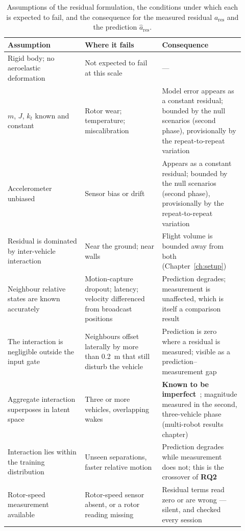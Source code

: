\begin{table}[t]
  \centering
  \caption{Assumptions of the residual formulation, the conditions under which each is expected to
    fail, and the consequence for the measured residual $a_{\mathrm{res}}$ and the prediction
    $\hat a_{\mathrm{res}}$.}
  \label{tab:model-assumptions}
  \small
  \begin{tabular}{@{}p{0.30\linewidth}p{0.30\linewidth}p{0.32\linewidth}@{}}
    \toprule
    Assumption & Where it fails & Consequence \\
    \midrule
    Rigid body; no aeroelastic deformation
      & Not expected to fail at this scale
      & --- \\
    $m$, $J$, $k_t$ known and constant
      & Rotor wear; temperature; miscalibration
      & Model error appears as a constant residual; bounded by the null scenarios (second phase), provisionally by the repeat-to-repeat variation \\
    Accelerometer unbiased
      & Sensor bias or drift
      & Appears as a constant residual; bounded by the null scenarios (second phase), provisionally by the repeat-to-repeat variation \\
    Residual is dominated by inter-vehicle interaction
      & Near the ground; near walls
      & Flight volume is bounded away from both (Chapter~\ref{ch:setup}) \\
    Neighbour relative states are known accurately
      & Motion-capture dropout; latency; velocity differenced from broadcast positions
      & Prediction degrades; measurement is unaffected, which is itself a comparison result \\
    The interaction is negligible outside the input gate
      & Neighbours offset laterally by more than \SI{0.2}{\metre} that still disturb the vehicle
      & Prediction is zero where a residual is measured; visible as a prediction--measurement gap \\
    Aggregate interaction superposes in latent space
      & Three or more vehicles, overlapping wakes
      & \textbf{Known to be imperfect}~\cite{shi2020neuralswarm,gielis2023aggregate}; magnitude measured in the second, three-vehicle phase (multi-robot results chapter) \\
    Interaction lies within the training distribution
      & Unseen separations, faster relative motion
      & Prediction degrades while measurement does not; this is the crossover of \textbf{RQ2} \\
    Rotor-speed measurement available
      & Rotor-speed sensor absent, or a rotor reading missing
      & Residual terms read zero or are wrong --- silent, and checked every session \\
    \bottomrule
  \end{tabular}
\end{table}

